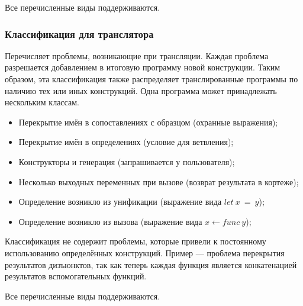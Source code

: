 Все перечисленные виды поддерживаются.


\subsubsection{Классификация для транслятора}

Перечисляет проблемы, возникающие при трансляции.
Каждая проблема разрешается добавлением в итоговую программу новой конструкции.
Таким образом, эта классификация также распределяет транслированные программы по наличию тех или иных конструкций.
Одна программа может принадлежать нескольким классам.

\begin{itemize}
    \item Перекрытие имён в сопоставлениях с образцом (охранные выражения);
    \item Перекрытие имён в определениях (условие для ветвления);
    \item Конструкторы и генерация (запрашивается у пользователя);
    \item Несколько выходных переменных при вызове (возврат результата в кортеже);
    \item Определение возникло из унификации (выражение вида $let~x~=~y$);
    \item Определение возникло из вызова (выражение вида $x \leftarrow func~y$);
\end{itemize}

Классификация не содержит проблемы, которые привели к постоянному использованию определённых конструкций.
Пример --- проблема перекрытия результатов дизъюнктов, так как теперь каждая функция является конкатенацией результатов вспомогательных функций.

Все перечисленные виды поддерживаются.
